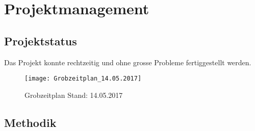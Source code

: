 \section{Projektmanagement}\label{projektmanagement}
\subsection{Projektstatus}\label{projektstatus}
Das Projekt konnte rechtzeitig und ohne grosse Probleme fertiggestellt werden.

\begin{figure}
  \centering
  \texttt{[image: Grobzeitplan\_14.05.2017]}
  \caption{Grobzeitplan Stand: 14.05.2017}
\end{figure}

\subsection{Methodik}


